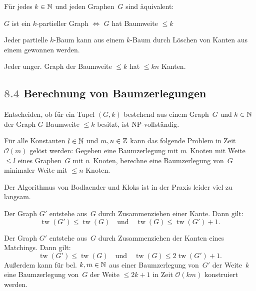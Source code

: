\documentclass{cheat-sheet}
\renewcommand{\O}{\mathcal{O}} %
\DeclareMathOperator{\treewidth}{tw} %
\newcommand{\scriptSection}[1]{\textcolor{gray}{#1}\enspace}
\begin{document}
\begin{satz}
  Für jedes $k \in \mathbb{N}$ und jeden Graphen~$G$ sind äquivalent:
  \begin{center}
    $G$ ist ein $k$-partieller Graph $\iff$ $G$ hat Baumweite $\leq k$
  \end{center}
\end{satz}

\begin{lem}
  Jeder partielle $k$-Baum kann aus einem $k$-Baum durch Löschen von Kanten aus einem gewonnen werden.
\end{lem}

\begin{lem}
  Jeder unger. Graph der Baumweite $\leq k$ hat $\leq k n$ Kanten.
\end{lem}

\subsection{\scriptSection{8.4} Berechnung von Baumzerlegungen}

\begin{bem}
  Entscheiden, ob für ein Tupel $(G, k)$ bestehend aus einem Graph~$G$ und $k \in \mathbb{N}$ der Graph $G$ Baumweite $\leq k$ besitzt, ist NP-vollständig.
\end{bem}

\begin{lem}
  Für alle Konstanten $l \in \mathbb{N}$ und $m, n \in \mathbb{Z}$ kann das folgende Problem in Zeit~$\O(m)$ gelöst werden:
  Gegeben eine Baumzerlegung mit $m$~Knoten mit Weite $\leq l$ eines Graphen~$G$ mit $n$~Knoten, berechne eine Baumzerlegung von~$G$ minimaler Weite mit $\leq n$ Knoten.
\end{lem}

\begin{bem}
  Der Algorithmus von Bodlaender und Kloks ist in der Praxis leider viel zu langsam.
\end{bem}

\begin{lem}
  Der Graph $G'$ entstehe aus~$G$ durch Zusammenziehen einer Kante.
  Dann gilt:
  \[
    \treewidth(G') \leq \treewidth(G)
    \quad \text{und} \quad
    \treewidth(G) \leq \treewidth(G') + 1.
  \]
\end{lem}

\begin{lem}
  Der Graph $G'$ entstehe aus~$G$ durch Zusammenziehen der Kanten eines Matchings.
  Dann gilt:
  \[
    \treewidth(G') \leq \treewidth(G)
    \quad \text{und} \quad
    \treewidth(G) \leq 2 \treewidth(G') + 1.
  \]
  Außerdem kann für bel. $k, m \in \mathbb{N}$ aus einer Baumzerlegung von~$G'$ der Weite~$k$ eine Baumzerlegung von~$G$ der Weite $\leq 2 k + 1$ in Zeit $\O(k m)$ konstruiert werden.
\end{lem}
\end{document}
